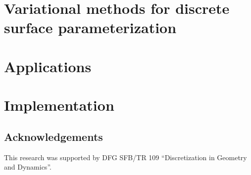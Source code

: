 \documentclass[a4paper]{book}
\def\mainbibliography {
	\backmatter
	\setcounter{secnumdepth}{-1}
	
	
}
\begin{document}
\newpage

\tableofcontents
\newpage

\newpage
\mainmatter
\setcounter{secnumdepth}{-1}

\setcounter{secnumdepth}{2}
\part{Variational methods for discrete surface parameterization}
\label{part:uniformization}

%
%
%
%
%
\setcounter{part}{1}
\part{Applications}
\label{part:applications}



\part{Implementation}
\label{part:implementation}





\newpage

\mainbibliography

\backmatter
\appendix


\chapter{Acknowledgements}

This research was supported by DFG SFB/TR 109 ``Discretization in Geometry
and Dynamics''.
\end{document}
